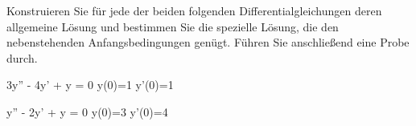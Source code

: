 \begin{atiTask}[
	title = Die charakteristische Gleichung
]
	Konstruieren Sie für jede der beiden folgenden Differentialgleichungen deren allgemeine Lösung und bestimmen Sie die spezielle Lösung, die den nebenstehenden Anfangsbedingungen genügt.
	Führen Sie anschließend eine Probe durch.
	\begin{atiSubequations}
		\item{
			3y'' - 4y' + y = 0
			\separate
			y(0)=1
			\separate
			y'(0)=1
		}
		\item{
			y'' - 2y' + y = 0
			\separate
			y(0)=3
			\separate
			y'(0)=4
		}
	\end{atiSubequations}
\end{atiTask}